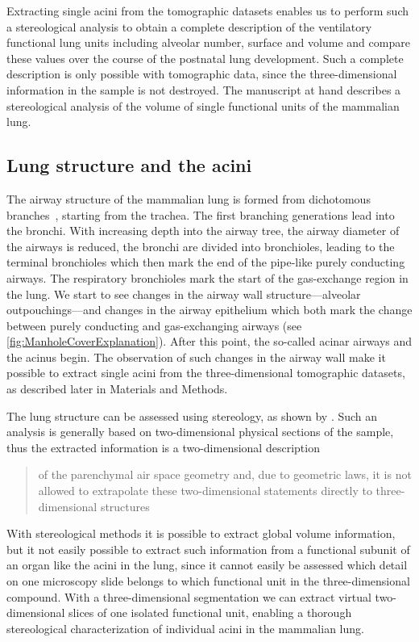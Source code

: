 \documentclass[%
	twoside,
	paper=a4,%
	abstract=true,%
	]{scrartcl}
\begin{document}
Extracting single acini from the tomographic datasets enables us to perform such a stereological analysis to obtain a complete description of the ventilatory functional lung units including alveolar number, surface and volume and compare these values over the course of the postnatal lung development. Such a complete description is only possible with tomographic data, since the three-dimensional information in the sample is not destroyed. The manuscript at hand describes a stereological analysis of the volume of single functional units of the mammalian lung.

\subsection{Lung structure and the acini}
The airway structure of the mammalian lung is formed from dichotomous branches~\cite{Weibel1991}, starting from the trachea. The first branching generations lead into the bronchi. With increasing depth into the airway tree, the airway diameter of the airways is reduced, the bronchi are divided into bronchioles, leading to the terminal bronchioles which then mark the end of the pipe-like purely conducting airways. The respiratory bronchioles mark the start of the gas-exchange region in the lung. We start to see changes in the airway wall structure---alveolar outpouchings---and changes in the airway epithelium which both mark the change between purely conducting and gas-exchanging airways (see \autoref{fig:ManholeCoverExplanation}). After this point, the so-called acinar airways and the acinus begin. The observation of such changes in the airway wall make it possible to extract single acini from the three-dimensional tomographic datasets, as described later in Materials and Methods.

The lung structure can be assessed using stereology, as shown by \citet{Tschanz2002}. Such an analysis is generally based on two-dimensional physical sections of the sample, thus the extracted information is a two-dimensional description \blockquote[\cite{Tschanz2002}]{of the parenchymal air space geometry and, due to geometric laws, it is not allowed to extrapolate these two-dimensional statements directly to three-dimensional structures}. With stereological methods it is possible to extract global volume information, but it not easily possible to extract such information from a functional subunit of an organ like the acini in the lung, since it cannot easily be assessed which detail on one microscopy slide belongs to which functional unit in the three-dimensional compound. With a three-dimensional segmentation we can extract virtual two-dimensional slices of one isolated functional unit, enabling a thorough stereological characterization of individual acini in the mammalian lung.
\end{document}
